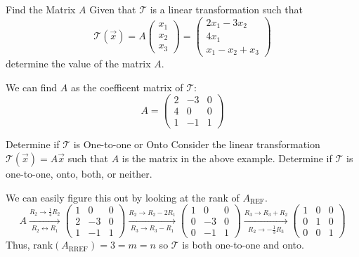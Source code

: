 \begin{example}{Find the Matrix $A$}{}
    Given that $\mathcal{T}$ is a linear transformation such that 
    \[
        \mathcal{T}\left(\vec{x}\right) = 
        A\begin{pmatrix} x_1 \\ x_2 \\ x_3 \end{pmatrix} = 
        \begin{pmatrix}
            2x_1 - 3x_2 \\
            4x_1 \\
            x_1 - x_2 + x_3
        \end{pmatrix}
    \]
    determine the value of the matrix $A$.
    \begin{solution}
        We can find $A$ as the coefficent matrix of $\mathcal{T}$:
        \[
            A = \begin{pmatrix}
               2 & -3 & 0 \\
               4 & 0 & 0 \\
               1 & -1 & 1 
            \end{pmatrix}
        \]
    \end{solution}
\end{example}

\begin{example}{Determine if $\mathcal{T}$ is One-to-one or Onto}{}
    Consider the linear transformation $\mathcal{T}\left(\vec{x}\right) = A\vec{x}$ such that $A$ is the matrix in the above example. Determine if $\mathcal{T}$ is one-to-one, onto, both, or neither.
    \begin{solution}
        We can easily figure this out by looking at the rank of $A_{\text{REF}}$. 
        \[
            A \xrightarrow[R_2 \leftrightarrow R_1]{R_2 \to \frac{1}{4}R_2}
            \begin{pmatrix}
                1 & 0 & 0 \\
                2 & -3 & 0 \\
                1 & -1 & 1
            \end{pmatrix}
            \xrightarrow[R_3 \to R_3 - R_1]{R_2 \to R_2 - 2R_1}
            \begin{pmatrix}
                1 & 0 & 0 \\
                0 & -3 & 0 \\
                0 & -1 & 1
            \end{pmatrix}
            \xrightarrow[R_2 \to -\frac{1}{3}R_3]{R_3 \to R_3 + R_2}
            \begin{pmatrix}
                1 & 0 & 0 \\
                0 & 1 & 0 \\
                0 & 0 & 1
            \end{pmatrix}
        \]
        Thus, $\text{rank}\left(A_{\text{RREF}}\right) = 3 = m = n$ so $\mathcal{T}$ is both one-to-one and onto.
    \end{solution}
\end{example}